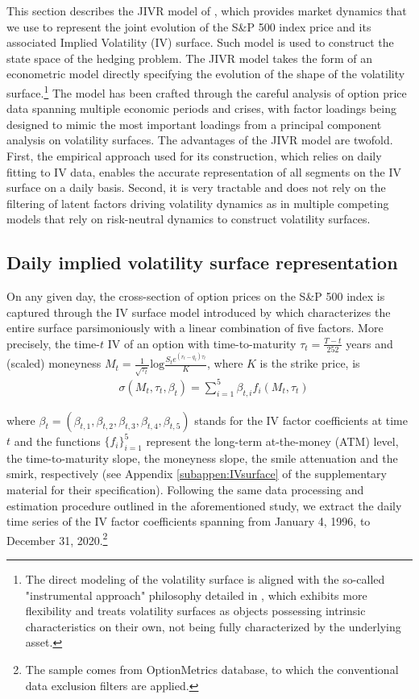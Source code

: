 \documentclass[12pt]{article}
\begin{document}
This section describes the JIVR model of \cite{Frnacois2023}, which provides market dynamics that we use to represent the joint evolution of the S\&P 500 index price and its associated Implied Volatility (IV) surface. Such model is used to construct the state space of the hedging problem. The JIVR model takes the form of an econometric model directly specifying the evolution of the shape of the volatility surface.\footnote{The direct modeling of the volatility surface is aligned with the so-called "instrumental approach" philosophy detailed in \cite{rebonato2004volatility}, which exhibits more flexibility and treats volatility surfaces as objects possessing intrinsic characteristics on their own, not being fully characterized by the underlying asset.} The model has been crafted through the careful analysis of option price data spanning multiple economic periods and crises, with factor loadings being designed to mimic the most important loadings from a principal component analysis on volatility surfaces. The advantages of the JIVR model are twofold. First, the empirical approach used for its construction, which relies on daily fitting to IV data, enables the accurate representation of all segments on the IV surface on a daily basis. Second, it is very tractable and does not rely on the filtering of latent factors driving volatility dynamics as in multiple competing models that rely on risk-neutral dynamics to construct volatility surfaces.




\subsection{Daily implied volatility surface representation}

On any given day, the cross-section of option prices on the S\&P 500 index is captured through the IV surface model introduced by \cite{Frnacois2022} which characterizes the entire surface parsimoniously with a linear combination of five factors. 
More precisely, the time-$t$ IV of an option with time-to-maturity $\tau_{t}=\frac{T-t}{252}$ years and (scaled) moneyness $M_{t}=\frac{1}{\sqrt{\tau_{t}}}\mbox{log}\frac{S_{t}e^{(r_{t}-q_{t})\tau_{t}}}{K}$, where $K$ is the strike price, is
\begin{align}
     & \sigma (M_{t},\tau_{t},\beta_{t}) =  \sum_{i=1}^{5}\beta_{t,i}f_{i}(M_{t},\tau_{t})
     \label{5factormodel_linear}
\end{align}

where $\beta_{t}=(\beta_{t,1},\beta_{t,2},\beta_{t,3},\beta_{t,4},\beta_{t,5})$ stands for the IV factor coefficients at time $t$ and the functions $\{f_{i} \}_{i=1}^{5}$ represent the long-term at-the-money (ATM) level, the time-to-maturity slope, the moneyness slope, the smile attenuation and the smirk, respectively (see Appendix \ref{subappen:IVsurface} of the supplementary material for their specification).
Following the same data processing and estimation procedure outlined in the aforementioned study, we extract the daily time series of the IV factor coefficients spanning from January 4, 1996, to December 31, 2020.\footnote{The sample comes from OptionMetrics database, to which the conventional data exclusion filters are applied.}
\end{document}
